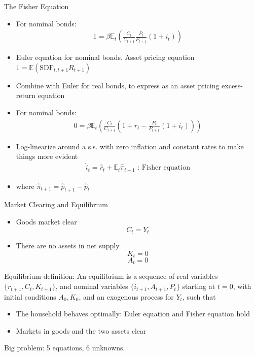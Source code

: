 \documentclass[11pt,aspectratio=169,xcolor={dvipsnames},hyperref={pdftex,pdfpagemode=UseNone,hidelinks,pdfdisplaydoctitle=true},usepdftitle=false]{beamer}
\begin{document}
\begin{frame}{The Fisher Equation}
\begin{itemize}
\item For nominal bonds:
\begin{align*}
1 = \beta \mathbb{E}_t \left(\frac{C_t}{C_{t+1}}\frac{P_t}{P_{t+1}}(1+i_t)\right)
\end{align*}
\item Euler equation for nominal bonds. Asset pricing equation $1 = \mathbb{E}(\text{SDF}_{t,t+1}R_{t+1})$
\item Combine with Euler for real bonds, to express as an asset pricing excess-return equation
\item For nominal bonds:
\begin{align*}
0 = \beta \mathbb{E}_t \left(\frac{C_t}{C_{t+1}}\left(1+r_t - \frac{P_t}{P_{t+1}}(1+i_t) \right)\right)
\end{align*}
\item Log-linearize around a s.s. with zero inflation and constant rates to make things more evident
\begin{align*}
\hat{i}_{t} = \hat{r}_t + \mathbb{E}_t \hat{\pi}_{t+1} \text{       : Fisher equation}
\end{align*}
\item where $\hat{\pi}_{t+1} = \hat{p}_{t+1} - \hat{p}_t$
\end{itemize}
\end{frame}


\begin{frame}{Market Clearing and Equilibrium}
\begin{itemize}
\item Goods market clear $$C_t = Y_t$$
\item There are no assets in net supply $$K_t = 0$$ $$A_t = 0$$
\end{itemize}
Equilibrium definition: An equilibrium is a sequence of real variables $\{r_{t+1},C_t,K_{t+1}\}$, and nominal variables $\{i_{t+1},A_{t+1},P_t\}$ starting at $t=0$, with initial conditions $A_0,K_0$, and an exogenous process for $Y_t$, such that
\begin{itemize}
\item The household behaves optimally: Euler equation and Fisher equation hold
\item Markets in goods and the two assets clear
\end{itemize}
Big problem: 5 equations, 6 unknowns.
\end{frame}
\end{document}
